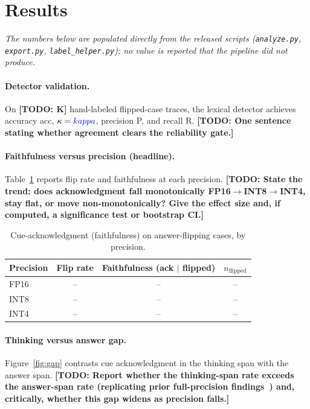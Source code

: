 \documentclass[11pt]{article}
\newcommand{\todo}[1]{{\color{red}\textbf{[TODO: #1]}}}
\newcommand{\res}[1]{{\color{blue}#1}}
\begin{document}
\section{Results}
\emph{The numbers below are populated directly from the released scripts
(\texttt{analyze.py}, \texttt{export.py}, \texttt{label\_helper.py}); no value is
reported that the pipeline did not produce.}

\paragraph{Detector validation.}\label{sec:validation}
On \todo{K} hand-labeled flipped-case traces, the lexical detector achieves
accuracy \res{acc}, $\kappa=\res{kappa}$, precision \res{P}, and recall \res{R}.
\todo{One sentence stating whether agreement clears the reliability gate.}

\paragraph{Faithfulness versus precision (headline).}
Table~\ref{tab:headline} reports flip rate and faithfulness at each precision.
\todo{State the trend: does acknowledgment fall monotonically FP16$\to$INT8$\to$INT4,
stay flat, or move non-monotonically? Give the effect size and, if computed, a
significance test or bootstrap CI.}

\begin{table}[h]\centering
\caption{Cue-acknowledgment (faithfulness) on answer-flipping cases, by precision.}
\label{tab:headline}
\begin{tabular}{lccc}
\toprule
Precision & Flip rate & Faithfulness (ack $\mid$ flipped) & $n_{\text{flipped}}$ \\
\midrule
FP16 & \res{--} & \res{--} & \res{--} \\
INT8 & \res{--} & \res{--} & \res{--} \\
INT4 & \res{--} & \res{--} & \res{--} \\
\bottomrule
\end{tabular}
\end{table}

\paragraph{Thinking versus answer gap.}
Figure~\ref{fig:gap} contrasts cue acknowledgment in the thinking span with the
answer span. \todo{Report whether the thinking-span rate exceeds the answer-span
rate (replicating prior full-precision findings~\cite{whymodelsknow2026}) and,
critically, whether this gap widens as precision falls.}
\end{document}
